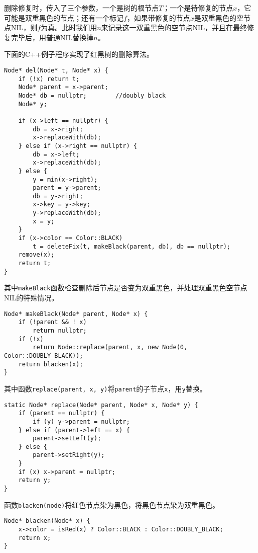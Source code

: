 \documentclass{ctexart}
\begin{document}
删除修复时，传入了三个参数，一个是树的根节点$T$；一个是待修复的节点$x$，它可能是双重黑色的节点；还有一个标记$f$，如果带修复的节点$x$是双重黑色的空节点NIL，则$f$为真。此时我们用$n$来记录这一双重黑色的空节点NIL，并且在最终修复完毕后，用普通NIL替换掉$n$。

下面的C++例子程序实现了红黑树的删除算法。

\lstset{language=C++}
\begin{lstlisting}
Node* del(Node* t, Node* x) {
    if (!x) return t;
    Node* parent = x->parent;
    Node* db = nullptr;        //doubly black
    Node* y;

    if (x->left == nullptr) {
        db = x->right;
        x->replaceWith(db);
    } else if (x->right == nullptr) {
        db = x->left;
        x->replaceWith(db);
    } else {
        y = min(x->right);
        parent = y->parent;
        db = y->right;
        x->key = y->key;
        y->replaceWith(db);
        x = y;
    }
    if (x->color == Color::BLACK)
        t = deleteFix(t, makeBlack(parent, db), db == nullptr);
    remove(x);
    return t;
}
\end{lstlisting}

其中\texttt{makeBlack}函数检查删除后节点是否变为双重黑色，并处理双重黑色空节点NIL的特殊情况。

\begin{lstlisting}
Node* makeBlack(Node* parent, Node* x) {
    if (!parent && ! x)
        return nullptr;
    if (!x)
        return Node::replace(parent, x, new Node(0, Color::DOUBLY_BLACK));
    return blacken(x);
}
\end{lstlisting}

其中函数\texttt{replace(parent, x, y)}将\texttt{parent}的子节点\texttt{x}，用\texttt{y}替换。

\begin{lstlisting}
static Node* replace(Node* parent, Node* x, Node* y) {
    if (parent == nullptr) {
        if (y) y->parent = nullptr;
    } else if (parent->left == x) {
        parent->setLeft(y);
    } else {
        parent->setRight(y);
    }
    if (x) x->parent = nullptr;
    return y;
}
\end{lstlisting}

函数\texttt{blacken(node)}将红色节点染为黑色，将黑色节点染为双重黑色。

\begin{lstlisting}
Node* blacken(Node* x) {
    x->color = isRed(x) ? Color::BLACK : Color::DOUBLY_BLACK;
    return x;
}
\end{lstlisting}
\end{document}
